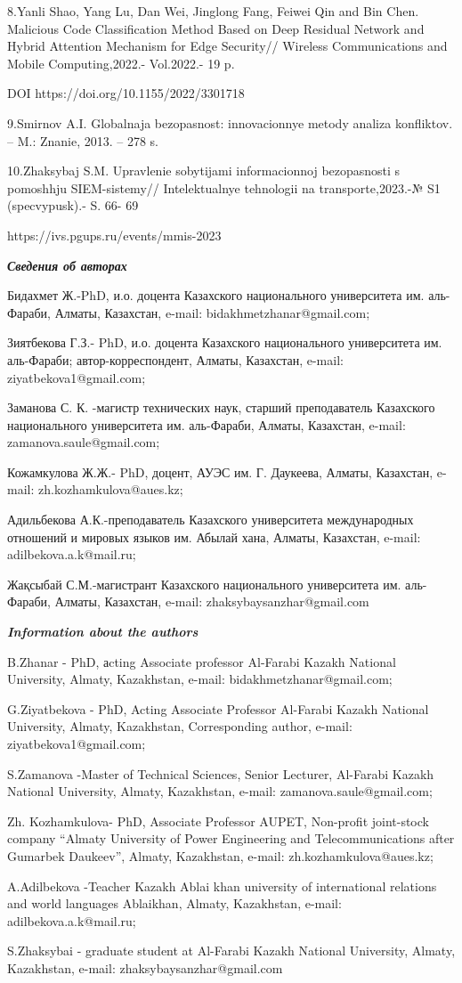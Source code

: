 8.Yanli Shao, Yang Lu, Dan Wei, Jinglong Fang, Feiwei Qin and Bin Chen.
Malicious Code Classification Method Based on Deep Residual Network and
Hybrid Attention Mechanism for Edge Security// Wireless Communications
and Mobile Computing,2022.- Vol.2022.- 19 p.

DOI https://doi.org/10.1155/2022/3301718

9.Smirnov A.I. Global\textquotesingle naja bezopasnost\textquotesingle:
innovacionnye metody analiza konfliktov. -- M.: Znanie, 2013. -- 278 s.

10.Zhaksybaj S.M. Upravlenie sobytijami informacionnoj bezopasnosti s
pomoshh\textquotesingle ju SIEM-sistemy//
Intelektual\textquotesingle nye tehnologii na transporte,2023.-№ S1
(specvypusk).- S. 66- 69

https://ivs.pgups.ru/events/mmis-2023

\emph{\textbf{Сведения об авторах}}

Бидахмет Ж.-PhD, и.о. доцента Казахского национального университета им.
аль-Фараби, Алматы, Казахстан, e-mail: bidakhmetzhanar@gmail.com;

Зиятбекова Г.З.- PhD, и.о. доцента Казахского национального университета
им. аль-Фараби; автор-корреспондент, Алматы, Казахстан, e-mail:
ziyatbekova1@gmail.com;

Заманова С. К. -магистр технических наук, старший преподаватель
Казахского национального университета им. аль-Фараби, Алматы, Казахстан,
e-mail: zamanova.saule@gmail.com;

Кожамкулова Ж.Ж.- PhD, доцент, АУЭС им. Г. Даукеева, Алматы, Казахстан,
e-mail: zh.kozhamkulova@aues.kz;

Адильбекова А.К.-преподаватель Казахского университета международных
отношений и мировых языков им. Абылай хана, Алматы, Казахстан, e-mail:
adilbekova.a.k@mail.ru;

Жақсыбай С.М.-магистрант Казахского национального университета им.
аль-Фараби, Алматы, Казахстан, e-mail: zhaksybaysanzhar@gmail.com

\emph{\textbf{Information about the authors}}

B.Zhanar - PhD, аcting Associate professor Al-Farabi Kazakh National
University, Almaty, Kazakhstan, e-mail: bidakhmetzhanar@gmail.com;

G.Ziyatbekova - PhD, Acting Associate Professor Al-Farabi Kazakh
National University, Almaty, Kazakhstan, Corresponding author, e-mail:
ziyatbekova1@gmail.com;

S.Zamanova -Master of Technical Sciences, Senior Lecturer, Al-Farabi
Kazakh National University, Almaty, Kazakhstan, e-mail:
zamanova.saule@gmail.com;

Zh. Kozhamkulova- PhD, Associate Professor AUPET, Non-profit joint-stock
company ``Almaty University of Power Engineering and Telecommunications
after Gumarbek Daukeev'', Almaty, Kazakhstan, e-mail:
zh.kozhamkulova@aues.kz;

A.Adilbekova -Teacher Kazakh Ablai khan university of international
relations and world languages Ablaikhan, Almaty, Kazakhstan, e-mail:
adilbekova.a.k@mail.ru;

S.Zhaksybai - graduate student at Al-Farabi Kazakh National University,
Almaty, Kazakhstan, e-mail: zhaksybaysanzhar@gmail.com
